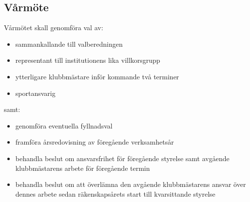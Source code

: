 \documentclass[a4paper]{article}
\begin{document}
  \subsection{Vårmöte}
  Vårmötet skall genomföra val av:
  \begin{itemize}
    \item sammankallande till valberedningen
    \item representant till institutionens lika villkorsgrupp
    \item ytterligare klubbmästare inför kommande två terminer
    \item sportansvarig
  \end{itemize}
  samt:
  \begin{itemize}
    \item genomföra eventuella fyllnadsval
    \item framföra årsredovisning av föregående verksamhetsår
    \item behandla beslut om ansvarsfrihet för föregående styrelse samt avgående
      klubbmästarens arbete för föregående termin
    \item behandla beslut om att överlämna den avgående klubbmästarens ansvar
      över dennes arbete sedan räkenskapsårets start till kvarsittande styrelse
  \end{itemize}
\end{document}
